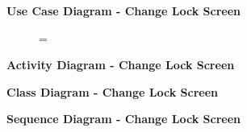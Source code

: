 \documentclass{article}
\begin{document}
		\begin{figure}[htbp]
			\textbf{Use Case Diagram - Change Lock Screen}
			\centering
			\begin{subfigure}{\textwidth}
				\resizebox{\textwidth}{!}{}
			\end{subfigure}
			\begin{subfigure}{\textwidth}
				=
			\end{subfigure}
		\end{figure}
		\clearpage

		\begin{figure}[htbp]
			\textbf{Activity Diagram - Change Lock Screen}
			\centering
			\begin{subfigure}{\textwidth}
				\centering
				\scalebox{0.9}{}
			\end{subfigure}
			\begin{subfigure}{\textwidth}
				
			\end{subfigure}
		\end{figure}
		\clearpage
		
		\begin{figure}[htbp]
			\textbf{Class Diagram - Change Lock Screen}
			\centering
			\begin{subfigure}{\textwidth}
				\resizebox{\textwidth}{!}{}
			\end{subfigure}
			\begin{subfigure}{\textwidth}
				
			\end{subfigure}
		\end{figure}
		\clearpage
		
		\begin{figure}[htbp]
			\textbf{Sequence Diagram - Change Lock Screen}
			\centering
			\begin{subfigure}{\textwidth}
				\centering
				\scalebox{0.7}{}
			\end{subfigure}
			\begin{subfigure}{\textwidth}
				
			\end{subfigure}
		\end{figure}
		\clearpage
		
		
\end{document}
